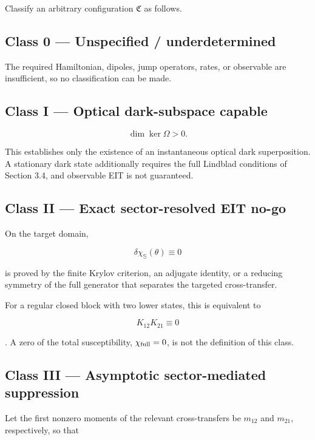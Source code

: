 \documentclass[
  10pt,
  a4paper,
]{article}
\begin{document}
Classify an arbitrary configuration \(\mathfrak C\) as follows.

\subsection{Class 0 --- Unspecified /
underdetermined}\label{class-0-unspecified-underdetermined}

The required Hamiltonian, dipoles, jump operators, rates, or observable
are insufficient, so no classification can be made.

\subsection{Class I --- Optical dark-subspace
capable}\label{class-i-optical-dark-subspace-capable}

\[
\dim\ker\Omega>0.
\]

This establishes only the existence of an instantaneous optical dark
superposition. A stationary dark state additionally requires the full
Lindblad conditions of Section 3.4, and observable EIT is not
guaranteed.

\subsection{Class II --- Exact sector-resolved EIT
no-go}\label{class-ii-exact-sector-resolved-eit-no-go}

On the target domain,

\[
\boxed{
\delta\chi_{\mathbb S}(\theta)\equiv0
}
\]

is proved by the finite Krylov criterion, an adjugate identity, or a
reducing symmetry of the full generator that separates the targeted
cross-transfer.

For a regular closed block with two lower states, this is equivalent to

\[
K_{12}K_{21}\equiv0
\]

. A zero of the total susceptibility, \(\chi_{\rm full}=0\), is not the
definition of this class.

\subsection{Class III --- Asymptotic sector-mediated
suppression}\label{class-iii-asymptotic-sector-mediated-suppression}

Let the first nonzero moments of the relevant cross-transfers be
\(m_{12}\) and \(m_{21}\), respectively, so that
\end{document}
